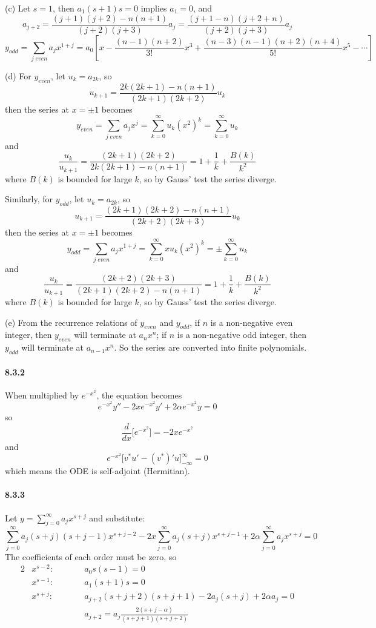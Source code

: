 \documentclass[a4paper]{article}
\begin{document}
(c) 
Let $s=1$, then $a_1(s+1)s=0$ implies $a_1=0$, and
\[
a_{j+2}=\frac{(j+1)(j+2)-n(n+1)}{(j+2)(j+3)}a_j=\frac{(j+1-n)(j+2+n)}{(j+2)(j+3)}a_j
\]
\[
y_{odd}=\sum_{j\;even}a_jx^{1+j}=a_0\left[x-\frac{(n-1)(n+2)}{3!}x^3+\frac{(n-3)(n-1)(n+2)(n+4)}{5!}x^5-\cdots \right]
\]

(d)
For $y_{even}$, let $u_k=a_{2k}$, so
\[
u_{k+1}=\frac{2k(2k+1)-n(n+1)}{(2k+1)(2k+2)}u_k
\]
then the series at $x=\pm 1$ becomes
\[
y_{even}=\sum_{j\;even}a_jx^j=\sum_{k=0}^\infty u_k(x^2)^k=\sum_{k=0}^\infty u_k
\]
and 
\[
\frac{u_k}{u_{k+1}}=\frac{(2k+1)(2k+2)}{2k(2k+1)-n(n+1)}=1+\frac{1}{k}+\frac{B(k)}{k^2}
\]
where $B(k)$ is bounded for large $k$, so by Gauss' test the series diverge.
\medskip

Similarly, for $y_{odd}$, let $u_k=a_{2k}$, so
\[
u_{k+1}=\frac{(2k+1)(2k+2)-n(n+1)}{(2k+2)(2k+3)}u_k
\]
then the series at $x=\pm 1$ becomes
\[
y_{odd}=\sum_{j\;even}a_jx^{1+j}=\sum_{k=0}^\infty xu_k(x^2)^k=\pm\sum_{k=0}^\infty u_k
\]
and 
\[
\frac{u_k}{u_{k+1}}=\frac{(2k+2)(2k+3)}{(2k+1)(2k+2)-n(n+1)}=1+\frac{1}{k}+\frac{B(k)}{k^2}
\]
where $B(k)$ is bounded for large $k$, so by Gauss' test the series diverge.
\medskip

(e)
From the recurrence relations of $y_{even}$ and $y_{odd}$, if $n$ is a non-negative even integer, then $y_{even}$ will terminate at $a_nx^n$; if $n$ is a non-negative odd integer, then $y_{odd}$ will terminate at $a_{n-1}x^n$. So the series are converted into finite polynomials.

\paragraph{8.3.2}
When multiplied by $e^{-x^2}$, the equation becomes
\[
e^{-x^2}y''-2xe^{-x^2}y'+2\alpha e^{-x^2}y=0
\]
so
\[
\frac{d}{dx}\big[e^{-x^2}\big]=-2xe^{-x^2}
\]
and 
\[
e^{-x^2}\big[v^*u'-(v^*)'u \big]_{-\infty}^\infty=0
\]
which means the ODE is self-adjoint (Hermitian).

\paragraph{8.3.3}
Let $y=\sum_{j=0}^\infty a_jx^{s+j}$ and substitute:
\[
\sum_{j=0}^\infty a_j(s+j)(s+j-1)x^{s+j-2}-2x\sum_{j=0}^\infty a_j(s+j)x^{s+j-1}+2\alpha\sum_{j=0}^\infty a_j x^{s+j}=0
\]
The coefficients of each order must be zero, so
\begin{alignat*}{2}
    & x^{s-2}:\qquad && a_0s(s-1)=0\\
    & x^{s-1}:\qquad && a_1(s+1)s=0\\
    & x^{s+j}:\qquad && a_{j+2}(s+j+2)(s+j+1)-2a_j(s+j)+2\alpha a_j=0 \\
    & && a_{j+2}=a_j\frac{2(s+j-\alpha)}{(s+j+1)(s+j+2)}
\end{alignat*}
\end{document}
